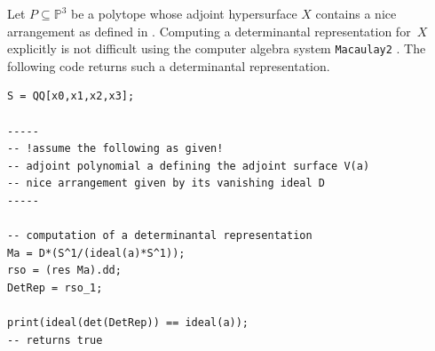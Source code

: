 \documentclass[a4paper,10pt]{amsart}
\theoremstyle{definition}
\theoremstyle{plain}
\newcommand{\pp}{\mathbb{P}}
\begin{document}
Let $P \subseteq \pp^3$ be a polytope whose adjoint hypersurface $X$ contains a nice arrangement as defined in . 
Computing a determinantal representation for~$X$ explicitly is not difficult using the computer algebra system \texttt{Macaulay2} \cite{M2}.
The following code returns such a determinantal representation.

\begin{verbatim}
S = QQ[x0,x1,x2,x3];

-----
-- !assume the following as given!
-- adjoint polynomial a defining the adjoint surface V(a)
-- nice arrangement given by its vanishing ideal D
-----

-- computation of a determinantal representation
Ma = D*(S^1/(ideal(a)*S^1));
rso = (res Ma).dd;
DetRep = rso_1;

print(ideal(det(DetRep)) == ideal(a));
-- returns true
\end{verbatim}
\end{document}
